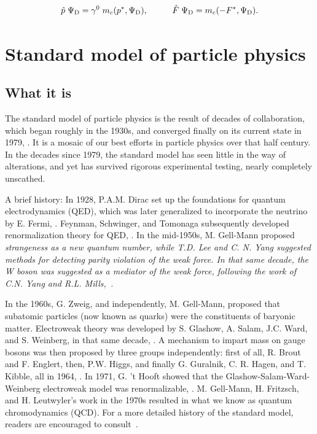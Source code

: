 \documentclass[letterpaper,12pt,titlepage,oneside,final]{book}
\begin{document}
\begin{equation}\hat{p}\hspace{1mm} \Psi_{\textup{D}} =  \gamma^0\hspace{1mm} m_c(p^*, \Psi_{\textup{D}}), \hspace{1cm} \hat{F}\hspace{1mm}\Psi_{\textup{D}} = m_c(-F^*, \Psi_{\textup{D}}).
\end{equation}






\chapter{Standard model of particle physics\label{SM}  }

\section{What it is\label{is}  }


The standard model of particle physics is the result of decades of collaboration, which began roughly in the 1930s, and converged finally on its current state in 1979, \cite{ramjbsm}.  It is a mosaic of our best efforts in particle physics over that half century.  In the decades since 1979, the standard model has seen little in the way of alterations, and yet has survived rigorous experimental testing, nearly completely unscathed.


A brief history:  In 1928, P.A.M. Dirac set up the foundations for quantum electrodynamics (QED), which was later generalized to incorporate the neutrino by E. Fermi, \cite{ramjbsm}.  Feynman, Schwinger, and Tomonaga subsequently developed renormalization theory for QED, \cite{kibble}.  In the mid-1950s, M. Gell-Mann  proposed \it strangeness \rm as a new quantum number, while 
T.D. Lee and C. N. Yang suggested methods for detecting parity violation of the weak force.  In that same decade, the W boson was suggested as a mediator of the weak force, following the work of  C.N. Yang and R.L. Mills,~\cite{ramjbsm}.

In the 1960s, G. Zweig, and independently, M. Gell-Mann, proposed that subatomic particles (now known as quarks) were the constituents of baryonic matter.  Electroweak theory was developed by S. Glashow, A. Salam, J.C. Ward, and S. Weinberg, in that same decade, \cite{ramjbsm}.  A mechanism to impart mass on gauge bosons was then proposed by three groups independently:  first of all, R. Brout and F. Englert, then, P.W. Higgs, and finally G. Guralnik, C. R. Hagen, and T. Kibble, all  in 1964, \cite{kibble}.  In 1971, G. 't Hooft showed that the Glashow-Salam-Ward-Weinberg electroweak model was renormalizable, \cite{thooft}. M. Gell-Mann, H. Fritzsch, and H. Leutwyler's work in the 1970s resulted in what we know as quantum chromodynamics (QCD).  For a more detailed history of the standard model, readers are encouraged to consult~\cite{ramjbsm}.
\end{document}
